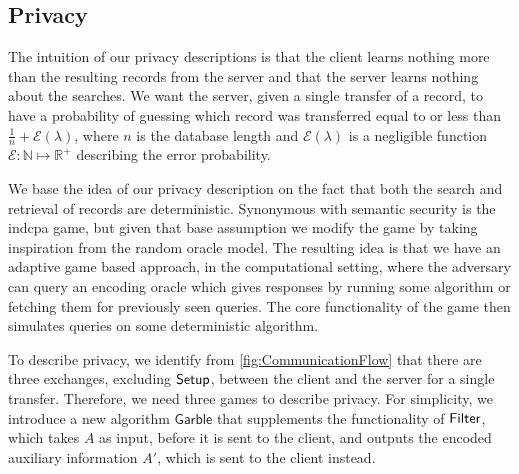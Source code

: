 \subsection*{\thesubsection\quad Privacy}\label{subsec:Privacy}

The intuition of our privacy descriptions is that the client learns nothing more than the resulting records from the server and that the server learns nothing about the searches. We want the server, given a single transfer of a record, to have a probability of guessing which record was transferred equal to or less than $ \frac{1}{n} + \mathcal{E} \left( \lambda \right) $, where $ n $ is the database length and $ \mathcal{E} \left( \lambda \right) $ is a negligible function $ \mathcal{E}: \mathbb{N} \mapsto \mathbb{R}^+ $ describing the error probability.

We base the idea of our privacy description on the fact that both the search and retrieval of records are deterministic. Synonymous with semantic security is the \acrshort{indcpa} game, but given that base assumption we modify the game by taking inspiration from the random oracle model. The resulting idea is that we have an adaptive game based approach, in the computational setting, where the adversary can query an encoding oracle which gives responses by running some algorithm or fetching them for previously seen queries. The core functionality of the game then simulates queries on some deterministic algorithm.

\newcommand{\Garble}{\ensuremath{\mathsf{{Garble}}}}
To describe privacy, we identify from \cref{fig:CommunicationFlow} that there are three exchanges, excluding $ \mathsf{{Setup}} $, between the client and the server for a single transfer. Therefore, we need three games to describe privacy. For simplicity, we introduce a new algorithm $ \Garble $ that supplements the functionality of $ \mathsf{{Filter}} $, which takes $ A $ as input, before it is sent to the client, and outputs the encoded auxiliary information $ A' $, which is sent to the client instead.

\hfill

